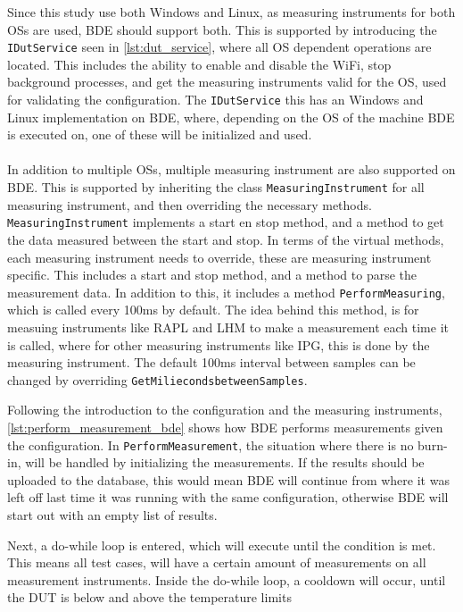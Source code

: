 

Since this study use both Windows and Linux, as measuring instruments for both OSs are used, BDE should support both. This is supported by introducing the \texttt{IDutService} seen in \cref{lst:dut_service}, where all OS dependent operations are located. This includes the ability to enable and disable the WiFi, stop background processes, and get the measuring instruments valid for the OS, used for validating the configuration. The \texttt{IDutService} this has an Windows and Linux implementation on BDE, where, depending on the OS of the machine BDE is executed on, one of these will be initialized and used.



\paragraph*{}
In addition to multiple OSs, multiple measuring instrument are also supported on BDE. This is supported by inheriting the class \texttt{MeasuringInstrument} for all measuring instrument, and then overriding the necessary methods. \texttt{MeasuringInstrument} implements a start en stop method, and a method to get the data measured between the start and stop. In terms of the virtual methods, each measuring instrument needs to override, these are measuring instrument specific. This includes a start and stop method, and a method to parse the measurement data. In addition to this, it includes a method \texttt{PerformMeasuring}, which is called every 100ms by default. The idea behind this method, is for measuing instruments like RAPL and LHM to make a measurement each time it is called, where for other measuring instruments like IPG, this is done by the measuring instrument. The default 100ms interval between samples can be changed by overriding \texttt{GetMiliecondsbetweenSamples}.



Following the introduction to the configuration and the measuring instruments, \cref{lst:perform_measurement_bde} shows how BDE performs measurements given the configuration. In \texttt{PerformMeasurement}, the situation where there is no burn-in, will be handled by initializing the measurements. If the results should be uploaded to the database, this would mean BDE will continue from where it was left off last time it was running with the same configuration, otherwise BDE will start out with an empty list of results.

Next, a do-while loop is entered, which will execute until the condition  is met. This means all test cases, will have a certain amount of measurements on all measurement instruments. Inside the do-while loop, a cooldown will occur, until the DUT is below and above the temperature limits
